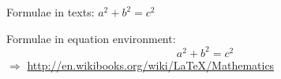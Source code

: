 Formulae in texts: $a^2 + b^2 = c^2$

\noindent Formulae in equation environment:
\begin{equation}
a^2 + b^2 = c^2
\end{equation}
$\Rightarrow$ \url{http://en.wikibooks.org/wiki/LaTeX/Mathematics}
